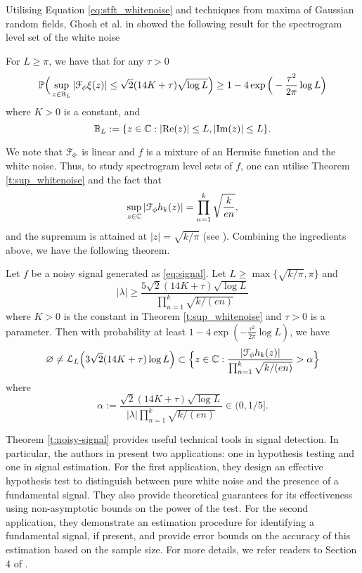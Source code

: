 Utilising Equation \eqref{eq:stft_whitenoise} and techniques from maxima of Gaussian random fields, Ghosh et al. in \cite{GhoshGAF} showed the following result for the spectrogram level set of the white noise
\begin{theorem} \label{t:sup_whitenoise}
    For $L\ge \pi$, we have that for any $\tau > 0$
    \[ \mathbb{P} \Big ( \sup_{z\in \mathbb{B}_L}|\mathcal{F}_\phi \xi (z)| \le \sqrt 2 (14K +\tau) \sqrt{\log L}\Big ) \ge 1 - 4 \exp \Big (- \frac{\tau^2}{2 \pi} \log L \Big )\]
    where $K>0$ is a constant, and
    \[ \mathbb{B}_L:= \{z\in \mathbb{C}: |\mathrm{Re}(z)|\le L, |\mathrm{Im}(z)|\le L\}.\]
\end{theorem}

We note that  $\mathcal{F}_\phi$ is linear and $f$ is a mixture of an Hermite function and the white noise. Thus, to study spectrogram level sets of $f$, one can utilise Theorem \ref{t:sup_whitenoise} and the fact that
\begin{equation}
    \sup_{z\in \mathbb{C}} |\mathcal{F}_\phi h_k(z)| = \prod_{n=1}^k\sqrt{\frac{k}{en}},
\end{equation}
and the supremum is attained at $|z|=\sqrt{k/\pi}$ (see \cite{GhoshGAF}). 
Combining the ingredients above, we have the following theorem.
\begin{theorem} \label{t:noisy-signal}
    Let $f$ be a noisy signal generated as \eqref{eq:signal}. Let $L\ge \max \{ \sqrt{k/\pi}, \pi\}$ and 
    \[ |\lambda | \ge \frac{5\sqrt{2}(14K + \tau) \sqrt{\log L}}{\prod_{n=1}^k \sqrt{k/(en)}}\]
    where $K>0$ is the constant in  Theorem \ref{t:sup_whitenoise} and $\tau>0$ is a parameter. Then with probability at least $1-4\exp(-\frac{\tau^2}{2\pi} \log L )$, we have
    \[ \varnothing  \neq \mathcal L_L\Big (3\sqrt{2}(14K+\tau)\log L \Big ) \subset \Big \{z\in \mathbb{C}: \frac{|\mathcal{F}_\phi h_k(z)|}{\prod_{n=1}^k \sqrt{k/(en)}} > \alpha\Big \}\]
    where
    \[\alpha := \frac{\sqrt{2}(14K + \tau) \sqrt{\log L}}{|\lambda|\prod_{n=1}^k \sqrt{k/(en)}} \in (0,1/5]. \]
\end{theorem}


Theorem \ref{t:noisy-signal} provides useful technical tools in signal detection. In particular, the authors in \cite{GhoshGAF} present two applications: one in hypothesis testing and one in signal estimation. For the first application, they design an effective hypothesis test to distinguish between pure white noise and the presence of a fundamental signal. They also provide theoretical guarantees for its effectiveness using non-asymptotic bounds on the power of the test. For the second application, they demonstrate an estimation procedure for identifying a fundamental signal, if present, and provide error bounds on the accuracy of this estimation based on the sample size. For more details, we refer readers to Section 4 of \cite{GhoshGAF}.

